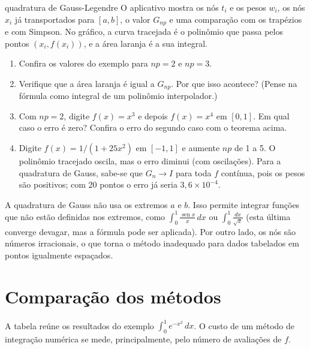 \begin{atividade}{quadratura de Gauss-Legendre}{\arqGauss}
O aplicativo mostra os nós $t_i$ e os pesos $w_i$, os nós $x_i$ já transportados para $[a,b]$,
o valor $G_{np}$ e uma comparação com os trapézios e com Simpson. No gráfico, a curva
tracejada é o polinômio que passa pelos pontos $(x_i,f(x_i))$, e a área laranja é a sua
integral.
\begin{enumerate}[nosep]
  \item Confira os valores do exemplo para $np=2$ e $np=3$.
  \item Verifique que a área laranja é igual a $G_{np}$. Por que isso acontece? (Pense na
        fórmula como integral de um polinômio interpolador.)
  \item Com $np=2$, digite $f(x)=x^3$ e depois $f(x)=x^4$ em $[0,1]$. Em qual caso o erro é
        zero? Confira o erro do segundo caso com o teorema acima.
  \item Digite $f(x)=1/(1+25x^2)$ em $[-1,1]$ e aumente $np$ de 1 a 5. O polinômio tracejado
        oscila, mas o erro diminui (com oscilações). Para a quadratura de Gauss, sabe-se que
        $G_n\to I$ para toda $f$ contínua, pois os pesos são positivos; com 20 pontos o erro
        já seria $3{,}6\times10^{-4}$.
\end{enumerate}
\end{atividade}

\begin{observacao}
A quadratura de Gauss não usa os extremos $a$ e $b$. Isso permite integrar funções que não
estão definidas nos extremos, como $\int_0^1\frac{\operatorname{sen}x}{x}\,dx$ ou
$\int_0^1\frac{dx}{\sqrt x}$ (esta última converge devagar, mas a fórmula pode ser aplicada).
Por outro lado, os nós são números irracionais, o que torna o método inadequado para dados
tabelados em pontos igualmente espaçados.
\end{observacao}

\section{Comparação dos métodos}

A tabela reúne os resultados do exemplo $\int_0^1 e^{-x^2}\,dx$. O custo de um método de
integração numérica se mede, principalmente, pelo número de avaliações de $f$.

